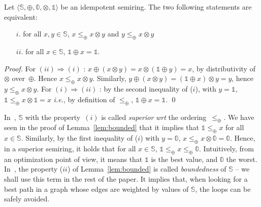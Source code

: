 \documentclass[runningheads]{llncs}
\def\ie{\textit{i.e.}\xspace}
\def\wrt{\textit{wrt}\xspace}
\def\<#1>{\langle #1 \rangle}
\newcommand{\Semiring}{\mathbb{S}}
\newcommand{\zero}{\mathbb{0}}
\newcommand{\one}{\mathbb{1}}
\newcommand{\dom}{\ensuremath{\mathit{dom}}}
\begin{document}
\begin{lemma}
\label{lem:superior}\label{lem:bounded}
Let $\< \Semiring, \oplus, \zero, \otimes, \one>$ be an idempotent semiring.
The two following statements are equivalent:
\begin{itemize}
\item [$i.$] for all $x, y \in \Semiring$,  
$x \leq_\oplus x \otimes y$ and 
$y \leq_\oplus x \otimes y$
\item[$ii.$] for all $x \in \Semiring$,  $\one \oplus x = \one$.
\end{itemize}
\end{lemma}
%
\begin{proof} %
For $(ii) \Rightarrow (i)$ : 
$x \oplus (x \otimes y) = x \otimes (\one \oplus y) = x$, 
by distributivity of~$\otimes$ over~$\oplus$. 
Hence $x \leq_\oplus x \otimes y$.
Similarly, $y \oplus (x \otimes y) = (\one \oplus x) \otimes y = y$, 
hence $y \leq_\oplus x \otimes y$.
%
For $(i) \Rightarrow (ii)$ :
by the second inequality of ($i$), with $y = \one$, 
$\one \leq_\oplus x \otimes \one = x$
\ie, by definition of $\leq_\oplus$, $\one \oplus x = \one$.
\qed
\end{proof}

In~\cite{Huang08advanceddynamic}, $\Semiring$ with the property~$(i)$ 
is called \emph{superior} \wrt the ordering~$\leq_\oplus$.
We have seen in the proof of Lemma~\ref{lem:bounded} that it implies that 
$\one \leq_\oplus x$ for all $x \in \Semiring$.
Similarly, by the first inequality of ($i$) with $y = \zero$,  
$x \leq_\oplus x \otimes \zero = \zero$.
%
Hence, in a superior semiring, %
it holds that %
for all $x \in \Semiring$, $\one \leq_\oplus x \leq_\oplus \zero$.
%
Intuitively, from an optimization point of view,
it means that $\one$ is the best value, and $\zero$ the worst.
%
In~\cite{Mohri02semiring}, the property ($ii$) of Lemma~\ref{lem:bounded}  
is called \emph{boundedness} of $\Semiring$ -- we shall use this term in the rest of the paper. 
It implies that, when looking for a best path in a graph whose edges
are weighted by values of $\Semiring$, the loops can be safely avoided.


\end{document}
